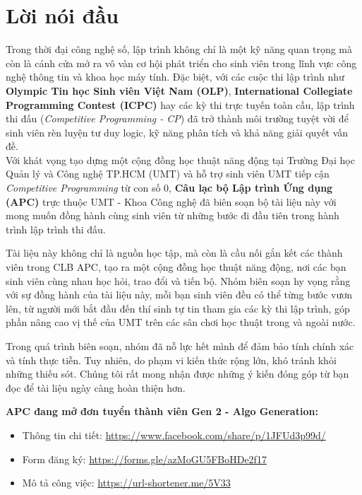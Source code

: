 \chapter*{Lời nói đầu}

Trong thời đại công nghệ số, lập trình không chỉ là một kỹ năng quan trọng mà còn là cánh cửa mở ra vô vàn cơ hội phát triển cho sinh viên trong lĩnh vực công nghệ thông tin và khoa học máy tính.  
Đặc biệt, với các cuộc thi lập trình như \textbf{Olympic Tin học Sinh viên Việt Nam (OLP)}, \textbf{International Collegiate Programming Contest (ICPC)} hay các kỳ thi trực tuyến toàn cầu, lập trình thi đấu (\textit{Competitive Programming - CP}) đã trở thành môi trường tuyệt vời để sinh viên rèn luyện tư duy logic, kỹ năng phân tích và khả năng giải quyết vấn đề.  \\

Với khát vọng tạo dựng một cộng đồng học thuật năng động tại Trường Đại học Quản lý và Công nghệ TP.HCM (UMT) và hỗ trợ sinh viên UMT tiếp cận \textit{Competitive Programming} từ con số 0, \textbf{Câu lạc bộ Lập trình Ứng dụng (APC)} trực thuộc UMT - Khoa Công nghệ đã biên soạn bộ tài liệu này với mong muốn đồng hành cùng sinh viên từ những bước đi đầu tiên trong hành trình lập trình thi đấu.

\vspace{0.5cm}

Tài liệu này không chỉ là nguồn học tập, mà còn là cầu nối gắn kết các thành viên trong CLB APC, tạo ra một cộng đồng học thuật năng động, nơi các bạn sinh viên cùng nhau học hỏi, trao đổi và tiến bộ.  
Nhóm biên soạn hy vọng rằng với sự đồng hành của tài liệu này, mỗi bạn sinh viên đều có thể từng bước vươn lên, từ người mới bắt đầu đến thí sinh tự tin tham gia các kỳ thi lập trình, góp phần nâng cao vị thế của UMT trên các sân chơi học thuật trong và ngoài nước.

\vspace{0.5cm}
\noindent
Trong quá trình biên soạn, nhóm đã nỗ lực hết mình để đảm bảo tính chính xác và tính thực tiễn. Tuy nhiên, do phạm vi kiến thức rộng lớn, khó tránh khỏi những thiếu sót. Chúng tôi rất mong nhận được những ý kiến đóng góp từ bạn đọc để tài liệu ngày càng hoàn thiện hơn.

\vspace{0.5cm}
\textbf{APC đang mở đơn tuyển thành viên Gen 2 - Algo Generation:}
\begin{itemize}
    \item Thông tin chi tiết: \url{https://www.facebook.com/share/p/1JFUd3p99d/}
    \item Form đăng ký: \url{https://forms.gle/azMoGU5FBoHDe2f17}
    \item Mô tả công việc: \url{https://url-shortener.me/5V33}
\end{itemize}

